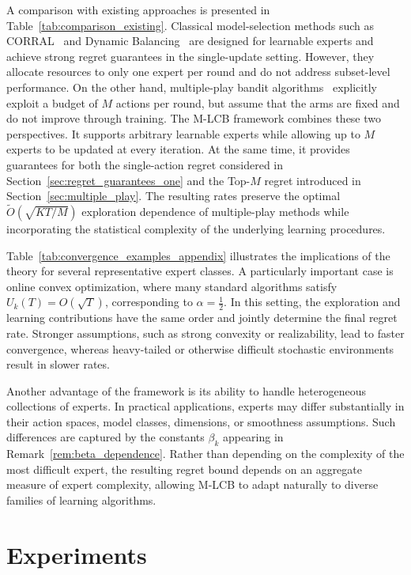 \documentclass[a4paper,14pt]{extarticle}
\theoremstyle{plain}
\newcommand{\algname}[1]{{\textsf  #1}}
\begin{document}
A comparison with existing approaches is presented in Table~\ref{tab:comparison_existing}. Classical model-selection methods such as CORRAL~\cite{pacchiano2020model} and Dynamic Balancing~\cite{cutkosky2021dynamic} are designed for learnable experts and achieve strong regret guarantees in the single-update setting. However, they allocate resources to only one expert per round and do not address subset-level performance. On the other hand, multiple-play bandit algorithms~\cite{seldin2014prediction,yun2018multi,kveton2015tight} explicitly exploit a budget of $M$ actions per round, but assume that the arms are fixed and do not improve through training. The \algname{M-LCB} framework combines these two perspectives. It supports arbitrary learnable experts while allowing up to $M$ experts to be updated at every iteration. At the same time, it provides guarantees for both the single-action regret considered in Section~\ref{sec:regret_guarantees_one} and the Top-$M$ regret introduced in Section~\ref{sec:multiple_play}. The resulting rates preserve the optimal $\tilde O(\sqrt{KT/M})$ exploration dependence of multiple-play methods while incorporating the statistical complexity of the underlying learning procedures.

Table~\ref{tab:convergence_examples_appendix} illustrates the implications of the theory for several representative expert classes. A particularly important case is online convex optimization, where many standard algorithms satisfy $U_k(T)=O(\sqrt{T})$, corresponding to $\alpha=\tfrac12$. In this setting, the exploration and learning contributions have the same order and jointly determine the final regret rate. Stronger assumptions, such as strong convexity or realizability, lead to faster convergence, whereas heavy-tailed or otherwise difficult stochastic environments result in slower rates.

Another advantage of the framework is its ability to handle heterogeneous collections of experts. In practical applications, experts may differ substantially in their action spaces, model classes, dimensions, or smoothness assumptions. Such differences are captured by the constants $\beta_k$ appearing in Remark~\ref{rem:beta_dependence}. Rather than depending on the complexity of the most difficult expert, the resulting regret bound depends on an aggregate measure of expert complexity, allowing \algname{M-LCB} to adapt naturally to diverse families of learning algorithms.


\section{Experiments}
\label{sec:experiments}
\end{document}
